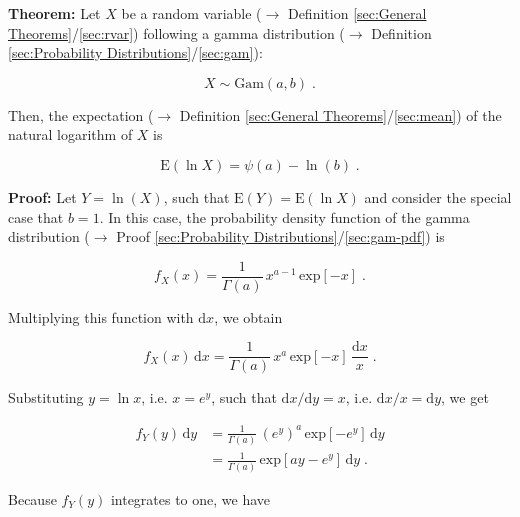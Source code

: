 \documentclass[a4paper,12pt,twoside]{book}
\begin{document}
\textbf{Theorem:} Let $X$ be a random variable ($\rightarrow$ Definition \ref{sec:General Theorems}/\ref{sec:rvar}) following a gamma distribution ($\rightarrow$ Definition \ref{sec:Probability Distributions}/\ref{sec:gam}):

\begin{equation} \label{eq:gam-logmean-gam}
X \sim \mathrm{Gam}(a, b) \; .
\end{equation}

Then, the expectation ($\rightarrow$ Definition \ref{sec:General Theorems}/\ref{sec:mean}) of the natural logarithm of $X$ is

\begin{equation} \label{eq:gam-logmean-gam-logmean}
\mathrm{E}(\ln X) = \psi(a) - \ln(b) \; .
\end{equation}


\vspace{1em}
\textbf{Proof:} Let $Y = \ln(X)$, such that $\mathrm{E}(Y) = \mathrm{E}(\ln X)$ and consider the special case that $b = 1$. In this case, the probability density function of the gamma distribution ($\rightarrow$ Proof \ref{sec:Probability Distributions}/\ref{sec:gam-pdf}) is

\begin{equation} \label{eq:gam-logmean-X-pdf-s1}
f_X(x) = \frac{1}{\Gamma(a)} \, x^{a-1} \, \mathrm{exp} [-x] \; .
\end{equation}

Multiplying this function with $\mathrm{d}x$, we obtain

\begin{equation} \label{eq:gam-logmean-X-pdf-s2}
f_X(x) \, \mathrm{d}x = \frac{1}{\Gamma(a)} \, x^a \, \mathrm{exp} [-x] \, \frac{\mathrm{d}x}{x} \; .
\end{equation}

Substituting $y = \ln x$, i.e. $x = e^y$, such that $\mathrm{d}x/\mathrm{d}y = x$, i.e. $\mathrm{d}x/x = \mathrm{d}y$, we get

\begin{equation} \label{eq:gam-logmean-Y-pdf-s1}
\begin{split}
f_Y(y) \, \mathrm{d}y &= \frac{1}{\Gamma(a)} \, \left( e^y \right)^a \, \mathrm{exp} [-e^y] \, \mathrm{d}y \\
&= \frac{1}{\Gamma(a)} \, \mathrm{exp}\left[ ay - e^y \right] \, \mathrm{d}y \; .
\end{split}
\end{equation}

Because $f_Y(y)$ integrates to one, we have
\end{document}
